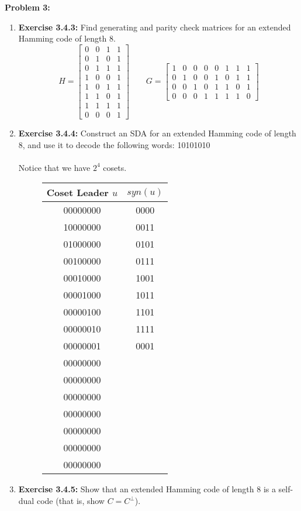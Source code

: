 \documentclass[11pt]{article}
\newenvironment{problem}[1]{\textbf{Problem #1: }}{\newpage}
\begin{document}
	\begin{problem}{3}
		\begin{enumerate}[label = (\alph*)]
			\item \textbf{Exercise 3.4.3:} Find generating and parity check matrices for an extended Hamming code of length 8.
			\[H = \left[\begin{array}{ccc|c}
				0 & 0 & 1 & 1 \\
				0 & 1 & 0 & 1 \\
				0 & 1 & 1 & 1 \\
				1 & 0 & 0 & 1 \\
				1 & 0 & 1 & 1 \\
				1 & 1 & 0 & 1 \\
				1 & 1 & 1 & 1 \\
				\hline
			    0 & 0 & 0 & 1
			\end{array}\right] \qquad G = \left[\begin{array}{ccccccc|c}
				1 & 0 & 0 & 0 & 0 & 1 & 1 & 1 \\
				0 & 1 & 0 & 0 & 1 & 0 & 1 & 1 \\
				0 & 0 & 1 & 0 & 1 & 1 & 0 & 1 \\
				0 & 0 & 0 & 1 & 1 & 1 & 1 & 0
			\end{array}\right]\]
			\item \textbf{Exercise 3.4.4:} Construct an SDA for an extended Hamming code of length 8, and use it to decode the following words: 10101010
			\\ \\
			Notice that we have $2^4$ cosets. 
			\begin{figure}[h!]
				\centering
				\begin{tabular}{c|c}
					Coset Leader $u$ & $syn(u)$ \\
					\hline
					00000000 & 0000\\
					10000000 & 0011\\
					01000000 & 0101\\
					00100000 & 0111\\
					00010000 & 1001\\
					00001000 & 1011\\
					00000100 & 1101\\
					00000010 & 1111\\
					00000001 & 0001\\
					00000000 & \\
					00000000 & \\
					00000000 & \\
					00000000 & \\
					00000000 & \\
					00000000 & \\
					00000000 & 
				\end{tabular}
			\end{figure}
			\newpage
			\item \textbf{Exercise 3.4.5:} Show that an extended Hamming code of length 8 is a self-dual code (that is, show $C = C^\perp$).
		\end{enumerate}
	\end{problem}
\end{document}
